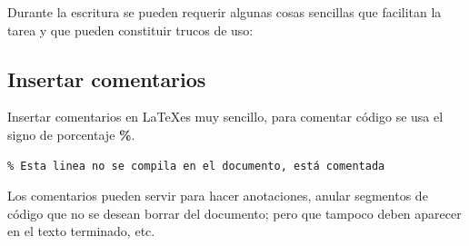 \par Durante la escritura se pueden requerir algunas cosas sencillas que facilitan la tarea y que pueden constituir trucos de uso:
\subsection{Insertar comentarios}
\par Insertar comentarios en \LaTeX es muy sencillo, para comentar código se usa el signo de porcentaje \textbf{\%}.
\begin{verbatim}
% Esta linea no se compila en el documento, está comentada
\end{verbatim}
\par Los comentarios pueden servir para hacer anotaciones, anular segmentos de código que no se desean borrar del documento; pero que tampoco deben aparecer en el texto terminado, etc.
\pagebreak
